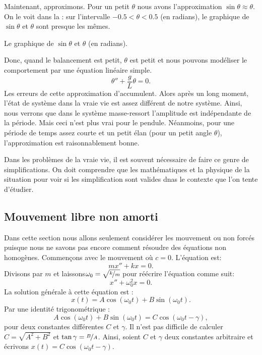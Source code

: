 Maintenant, approximons. Pour un petit $\theta$ nous avons l'approximation 
$\sin \theta \approx \theta$.  On le voit dans la :  sur l'intervalle 
$-0.5 < \theta < 0.5$ (en radians), le graphique de  $\sin \theta$ et $\theta$ sont presque les mêmes.

\begin{mywrapfig}{3.25in}
\capstart
{}
\caption{Le graphique de  $\sin \theta$ et $\theta$ (en radians).\label{mv:sinthetafig}}
\end{mywrapfig}

Donc, quand le balancement est petit,  $\theta$ est petit et nous pouvons modéliser le comportement par une équation linéaire simple.  
\begin{equation*}
\theta'' + \frac{g}{L} \theta = 0 .
\end{equation*}
Les erreurs de cette approximation d'accumulent. Alors après un long moment, l'état de système dans la vraie vie est assez différent de notre système. Ainsi, nous verrons que dans le système masse-ressort l'amplitude est indépendante de la période. 
Mais ceci n'est plus vrai pour le pendule.  Néanmoins, pour une période de temps assez courte et un petit élan (pour un petit angle $\theta$), l'approximation est raisonnablement bonne. 

Dans les problèmes de la vraie vie, il est souvent nécessaire de faire ce genre de simplifications.  On doit comprendre que les mathématiques et la physique de la situation pour voir si les simplification sont valides dnas le contexte que l'on tente d'étudier. 

\subsection{Mouvement libre non amorti}

Dans cette section nous allons seulement considérer les mouvement ou non forcés puisque nous ne savons pas encore comment résoudre des équations non homogènes. Commençons avec le mouvement
 où $c=0$.  L'équation est: 
\begin{equation*}
mx'' + kx = 0 .
\end{equation*}
Divisons par $m$ et laissons$\omega_0 = \sqrt{\nicefrac{k}{m}}$ pour réécrire l'équation comme suit: 
\begin{equation*}
x'' + \omega_0^2 x = 0 .
\end{equation*}
La solution générale à cette équation est : 
\begin{equation*}
x(t) = A \cos (\omega_0 t) + B \sin (\omega_0 t) .
\end{equation*}
Par une identité trigonométrique : 
\begin{equation*}
A \cos (\omega_0 t) + B \sin (\omega_0 t) =
C \cos ( \omega_0 t - \gamma ) ,
\end{equation*}
pour deux constantes différentes $C$ et $\gamma$.
Il n'est pas difficile de calculer $C= \sqrt{A^2 + B^2}$ et $\tan \gamma =
\nicefrac{B}{A}$.  Ainsi, soient
$C$ et $\gamma$ deux constantes arbitraire et écrivons 
$x(t) = C \cos ( \omega_0 t - \gamma )$.

